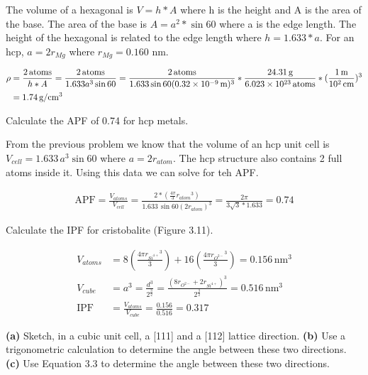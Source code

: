 \documentclass[12pt]{article}
\newenvironment{problem}[2][Problem]{\begin{trivlist}
\item[\hskip \labelsep {\bfseries #1}\hskip \labelsep {\bfseries #2.}]}{\end{trivlist}}
\begin{document}
The volume of a hexagonal is $V = h*A$ where h is the height and A is the area of the base. The area of the base is $A = a^2 * \sin{60}$ where a is the edge length. The height of the hexagonal is related to the edge length where $h = 1.633*a$. For an hcp, $a = 2r_{Mg}$ where $r_{Mg} = 0.160$ nm.

\begin{align*}
\rho &= \frac{2 \,\text{atoms}}{h*A} = \frac{2 \,\text{atoms}}{1.633a^3\sin{60}} = \frac{2 \,\text{atoms}}{1.633\sin{60}(0.32\times 10^{-9}\,\text{m})^3} * \frac{24.31\,\text{g}}{6.023\times 10^{23}\, \text{atoms}} * (\frac{1\,\text{m}}{10^2\,\text{cm}})^3 \\
 &= 1.74\,\text{g}/\text{cm}^3
\end{align*}

\begin{problem}{3.10}
Calculate the APF of 0.74 for hcp metals.
\end{problem}

From the previous problem we know that the volume of an hcp unit cell is $V_{cell} = 1.633\,a^3\sin{60}$ where $a = 2r_{atom}$. The hcp structure also contains 2 full atoms inside it. Using this data we can solve for teh APF.

\begin{align*}
\text{APF} = \frac{V_{atoms}}{V_{cell}} = \frac{2*(\frac{4\pi}{3}{r_{atom}}^3)}{1.633\,\sin{60}{(2r_{atom})}^3} = \frac{2\pi}{3\sqrt{3}*1.633} = 0.74
\end{align*}

\begin{problem}{3.17}
Calculate the IPF for cristobalite (Figure 3.11).
\end{problem}

\begin{align*}
V_{atoms} &= 8(\frac{4\pi {r_{Si^{4+}}}^3}{3}) + 16(\frac{4\pi {r_{O^{2-}}}^3}{3}) = 0.156 \,{\text{nm}}^3\\
V_{cube} &= a^3 = \frac{d^3}{2^{\frac{3}{2}}} = \frac{(8r_{O^{2-}} + 2r_{Si^{4+}})^3}{2^{\frac{3}{2}}} = 0.516\, {\text{nm}}^3 \\
\text{IPF} &= \frac{V_{atoms}}{V_{cube}} = \frac{0.156}{0.516} = 0.317
\end{align*}

\begin{problem}{3.27}
\textbf{(a)} Sketch, in a cubic unit cell, a [111] and a [112] lattice direction. \textbf{(b)} Use a trigonometric calculation to determine the angle between these two directions. \textbf{(c)} Use Equation 3.3 to determine the angle between these two directions.
\end{problem}
\end{document}

